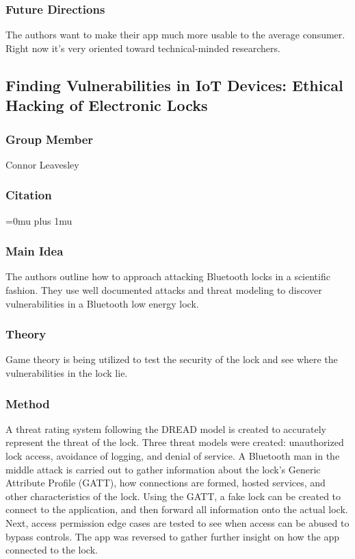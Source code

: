 \subsubsection{Future Directions}

\noindent
The authors want to make their app much more usable to the average consumer.  Right now it's very oriented toward technical-minded researchers.

\subsection[Finding Vulnerabilities in IoT Devices: Ethical Hacking of Electronic Locks]{Finding Vulnerabilities in IoT Devices: Ethical \\Hacking of Electronic Locks}

\subsubsection{Group Member}

\noindent
Connor Leavesley

\noindent
\subsubsection{Citation}

\Urlmuskip=0mu plus 1mu\relax
{}

\subsubsection{Main Idea}

\noindent
The authors outline how to approach attacking Bluetooth locks in a scientific fashion. They use well documented attacks and threat modeling to discover vulnerabilities in a Bluetooth low energy lock.

\subsubsection{Theory}

\noindent
Game theory is being utilized to test the security of the lock and see where the vulnerabilities in the lock lie. 

\subsubsection{Method}

\noindent
A threat rating system following the DREAD model is created to accurately represent the threat of the lock. Three threat models were created: unauthorized lock access, avoidance of logging, and denial of service. A Bluetooth man in the middle attack is carried out to gather information about the lock’s Generic Attribute Profile (GATT), how connections are formed, hosted services, and other characteristics of the lock. Using the GATT, a fake lock can be created to connect to the application, and then forward all information onto the actual lock. Next, access permission edge cases are tested to see when access can be abused to bypass controls. The app was reversed to gather further insight on how the app connected to the lock. 

